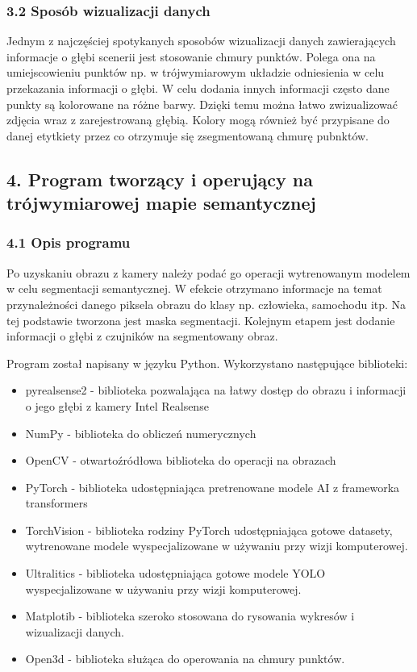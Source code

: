 \documentclass[
]{article}
\providecommand{\tightlist}{%
  \setlength{\itemsep}{0pt}\setlength{\parskip}{0pt}}
\begin{document}
\subsubsection{3.2 Sposób wizualizacji danych}\label{sposuxf3b-wizualizacji-danych}

Jednym z najczęściej spotykanych sposobów wizualizacji danych zawierających informacje o głębi scenerii jest stosowanie chmury punktów. Polega ona na umiejscowieniu punktów np. w trójwymiarowym układzie odniesienia w celu przekazania informacji o głębi. W celu dodania innych informacji często dane punkty są kolorowane na różne barwy. Dzięki temu można łatwo zwizualizować zdjęcia wraz z zarejestrowaną głębią. Kolory mogą również być przypisane do danej etytkiety przez co otrzymuje się zsegmentowaną chmurę pubnktów.

\subsection{4. Program tworzący i operujący na trójwymiarowej mapie semantycznej}\label{program-tworzux105cy-i-operujux105cy-na-truxf3jwymiarowej-mapie-semantycznej}

\subsubsection{4.1 Opis programu}\label{opis-programu}

Po uzyskaniu obrazu z kamery należy podać go operacji wytrenowanym modelem w celu segmentacji semantycznej. W efekcie otrzymano informacje na temat przynależności danego piksela obrazu do klasy np. człowieka, samochodu itp. Na tej podstawie tworzona jest maska segmentacji. Kolejnym etapem jest dodanie informacji o głębi z czujników na segmentowany obraz.

Program został napisany w języku Python. Wykorzystano następujące biblioteki:

\begin{itemize}
\tightlist
\item
  pyrealsense2 - biblioteka pozwalająca na łatwy dostęp do obrazu i informacji o jego głębi z kamery Intel Realsense
\item
  NumPy - biblioteka do obliczeń numerycznych
\item
  OpenCV - otwartoźródłowa biblioteka do operacji na obrazach
\item
  PyTorch - biblioteka udostępniająca pretrenowane modele AI z frameworka transformers
\item
  TorchVision - biblioteka rodziny PyTorch udostępniająca gotowe datasety, wytrenowane modele wyspecjalizowane w używaniu przy wizji komputerowej.
\item
  Ultralitics - biblioteka udostępniająca gotowe modele YOLO wyspecjalizowane w używaniu przy wizji komputerowej.
\item
  Matplotib - biblioteka szeroko stosowana do rysowania wykresów i wizualizacji danych.
\item
  Open3d - biblioteka służąca do operowania na chmury punktów.
\end{itemize}
\end{document}
